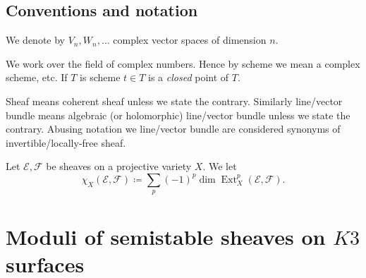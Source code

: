 \documentclass[11pt]{amsart}
\let\mathcal\mathscr
\def\cE{\mathcal{E}}
\def\cF{\mathcal{F}}
\DeclareMathOperator{\Ext}{Ext}
\theoremstyle{definition}
\theoremstyle{remark}
\begin{document}
\subsection{Conventions and notation}
%
%
\setcounter{equation}{0}
%
We denote by $V_n,W_n,\ldots$ complex vector spaces of dimension $n$.

We work over the field of complex numbers.
Hence by scheme  we mean a complex scheme, etc. If $T$ is scheme $t\in T$  is a \emph{closed} point of $T$.  

Sheaf means coherent sheaf unless we  state the contrary. Similarly line/vector bundle  means algebraic (or holomorphic) line/vector bundle   unless we  state the contrary. Abusing notation we  line/vector bundle are considered synonyms of invertible/locally-free sheaf.

Let $\cE,\cF$ be  sheaves on a projective variety $X$. We let
%
\begin{equation}
%
\chi_X(\cE,\cF)\coloneqq
\sum_p (-1)^p\dim\Ext^p_X(\cE,\cF).
%
\end{equation}
%



\section{Moduli of semistable sheaves  on $K3$ surfaces}\label{sec:kappatre}
%
%
\end{document}
